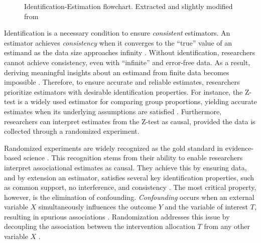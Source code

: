 \documentclass[
  authoryear,
  review,
  1p]{elsarticle}
\begin{document}
\begin{figure}


\caption{\label{fig-IEflow}Identification-Estimation flowchart.
Extracted and slightly modified from \citet[pp.~32]{Neal_2020}}

\end{figure}%

Identification is a necessary condition to ensure \emph{consistent}
estimators. An estimator achieves \emph{consistency} when it converges
to the ``true'' value of an estimand as the data size approaches
infinity \citep{Everitt_et_al_2010}. Without identification, researchers
cannot achieve consistency, even with ``infinite'' and error-free data.
As a result, deriving meaningful insights about an estimand from finite
data becomes impossible \citep[pp.~5]{Schuessler_et_al_2023}. Therefore,
to ensure accurate and reliable estimates, researchers prioritize
estimators with desirable identification properties. For instance, the
Z-test is a widely used estimator for comparing group proportions,
yielding accurate estimates when its underlying assumptions are
satisfied \citep{Kanji_2006}. Furthermore, researchers can interpret
estimates from the Z-test as causal, provided the data is collected
through a randomized experiment.

Randomized experiments are widely recognized as the gold standard in
evidence-based science \citep{Hariton_et_al_2018, Hansson_2014}. This
recognition stems from their ability to enable researchers interpret
associational estimates as causal. They achieve this by ensuring data,
and by extension an estimator, satisfies several key identification
properties, such as common support, no interference, and consistency
\citep{Morgan_et_al_2014, Neal_2020}. The most critical property,
however, is the elimination of confounding. \emph{Confounding} occurs
when an external variable \(X\) simultaneously influences the outcome
\(Y\) and the variable of interest \(T\), resulting in spurious
associations \citep{Everitt_et_al_2010}. Randomization addresses this
issue by decoupling the association between the intervention allocation
\(T\) from any other variable \(X\)
\citep{Morgan_et_al_2014, Neal_2020}.
\end{document}
